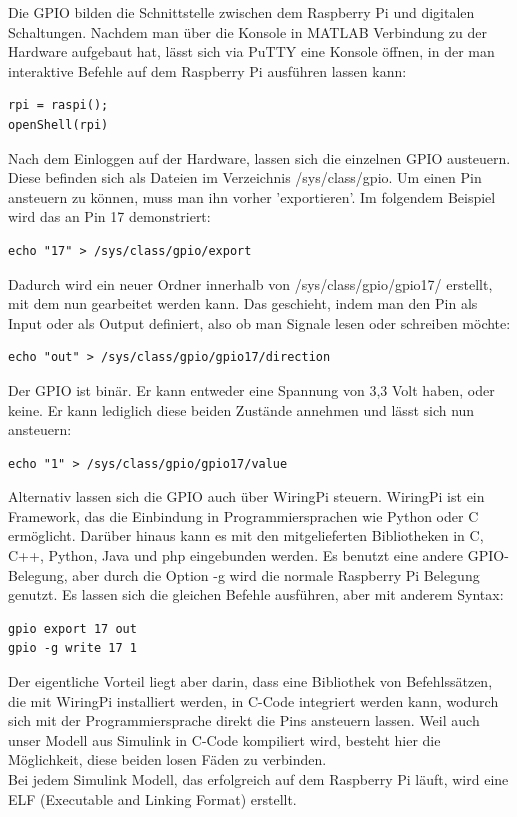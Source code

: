 Die GPIO bilden die Schnittstelle zwischen dem Raspberry Pi und digitalen Schaltungen. Nachdem man über die Konsole in MATLAB Verbindung zu der Hardware aufgebaut hat, lässt sich via PuTTY eine Konsole öffnen, in der man interaktive Befehle auf dem Raspberry Pi ausführen lassen kann:
\lstset{language=bash}          
\begin{lstlisting}[frame=single]
rpi = raspi();
openShell(rpi)
\end{lstlisting}
Nach dem Einloggen auf der Hardware, lassen sich die einzelnen GPIO austeuern. Diese befinden sich als Dateien im Verzeichnis /sys/class/gpio. Um einen Pin ansteuern zu können, muss man ihn vorher 'exportieren'. Im folgendem Beispiel wird das an Pin 17 demonstriert:
\lstset{language=bash}          
\begin{lstlisting}[frame=single]
echo "17" > /sys/class/gpio/export
\end{lstlisting}
Dadurch wird ein neuer Ordner innerhalb von /sys/class/gpio/gpio17/ erstellt, mit dem nun gearbeitet werden kann. Das geschieht, indem man den Pin als Input oder als Output definiert, also ob man Signale lesen oder schreiben möchte: 
\lstset{language=bash}          
\begin{lstlisting}[frame=single]
echo "out" > /sys/class/gpio/gpio17/direction
\end{lstlisting}
Der GPIO ist binär. Er kann entweder eine Spannung von 3,3 Volt haben, oder keine. Er kann lediglich diese beiden Zustände annehmen und lässt sich nun ansteuern:
\lstset{language=bash}          
\begin{lstlisting}[frame=single]
echo "1" > /sys/class/gpio/gpio17/value
\end{lstlisting} 

Alternativ lassen sich die GPIO auch über WiringPi steuern. WiringPi ist ein Framework, das die Einbindung in Programmiersprachen wie Python oder C ermöglicht.  
Darüber hinaus kann es mit den mitgelieferten Bibliotheken in C, C++, Python, Java und php eingebunden werden. Es benutzt eine andere GPIO-Belegung, aber durch die Option -g wird die normale Raspberry Pi Belegung genutzt. Es lassen sich die gleichen Befehle ausführen, aber mit anderem Syntax:
\lstset{language=bash}          
\begin{lstlisting}[frame=single]
gpio export 17 out 
gpio -g write 17 1 
\end{lstlisting}
Der eigentliche Vorteil liegt aber darin, dass eine Bibliothek von Befehlssätzen, die mit WiringPi installiert werden, in C-Code integriert werden kann, wodurch sich mit der Programmiersprache direkt die Pins ansteuern lassen. Weil auch unser Modell aus Simulink in C-Code kompiliert wird, besteht hier die Möglichkeit, diese beiden losen Fäden zu verbinden. \\
Bei jedem Simulink Modell, das erfolgreich auf dem Raspberry Pi läuft, wird eine ELF (Executable and Linking Format) erstellt. \\ \\

